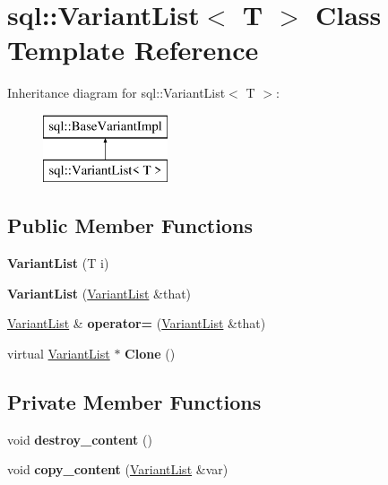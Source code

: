 \hypertarget{classsql_1_1_variant_list}{}\section{sql\+:\+:Variant\+List$<$ T $>$ Class Template Reference}
\label{classsql_1_1_variant_list}
Inheritance diagram for sql\+:\+:Variant\+List$<$ T $>$\+:\begin{figure}[H]
\begin{center}
\leavevmode
\includegraphics[height=2.000000cm]{classsql_1_1_variant_list}
\end{center}
\end{figure}
\subsection*{Public Member Functions}
\begin{DoxyCompactItemize}
\item 
\hypertarget{classsql_1_1_variant_list_a5973123c3f878ad52f5fa55f9a5bcbf9}{}\label{classsql_1_1_variant_list_a5973123c3f878ad52f5fa55f9a5bcbf9} 
{\bfseries Variant\+List} (T i)
\item 
\hypertarget{classsql_1_1_variant_list_a9317f749d181ed90bee721fb68491e27}{}\label{classsql_1_1_variant_list_a9317f749d181ed90bee721fb68491e27} 
{\bfseries Variant\+List} (\hyperlink{classsql_1_1_variant_list}{Variant\+List} \&that)
\item 
\hypertarget{classsql_1_1_variant_list_aa8ce979522fc282003edc70e97e5c080}{}\label{classsql_1_1_variant_list_aa8ce979522fc282003edc70e97e5c080} 
\hyperlink{classsql_1_1_variant_list}{Variant\+List} \& {\bfseries operator=} (\hyperlink{classsql_1_1_variant_list}{Variant\+List} \&that)
\item 
\hypertarget{classsql_1_1_variant_list_adc6519883b262a78ecddc51925f7ce4b}{}\label{classsql_1_1_variant_list_adc6519883b262a78ecddc51925f7ce4b} 
virtual \hyperlink{classsql_1_1_variant_list}{Variant\+List} $\ast$ {\bfseries Clone} ()
\end{DoxyCompactItemize}
\subsection*{Private Member Functions}
\begin{DoxyCompactItemize}
\item 
\hypertarget{classsql_1_1_variant_list_a86186fc1d8a877b98d7f39cfbe813380}{}\label{classsql_1_1_variant_list_a86186fc1d8a877b98d7f39cfbe813380} 
void {\bfseries destroy\+\_\+content} ()
\item 
\hypertarget{classsql_1_1_variant_list_a2bca42e5938c59c6a17cb5dbeb246f90}{}\label{classsql_1_1_variant_list_a2bca42e5938c59c6a17cb5dbeb246f90} 
void {\bfseries copy\+\_\+content} (\hyperlink{classsql_1_1_variant_list}{Variant\+List} \&var)
\end{DoxyCompactItemize}
